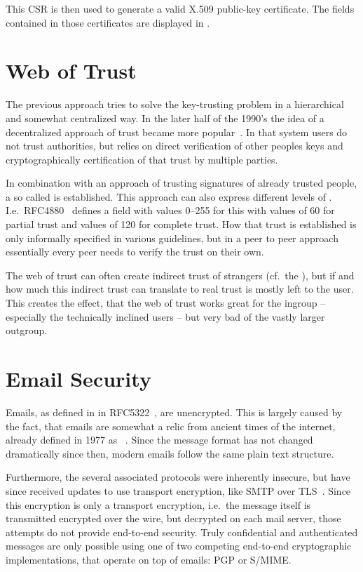 This CSR is then used to generate a valid X.509 public-key certificate.
The fields contained in those certificates are displayed in .

\section{Web of Trust}\label{sec:pgpWebOfTrust}
The previous approach tries to solve the key-trusting problem in a hierarchical and somewhat centralized way.
In the later half of the 1990's the idea of a decentralized approach of trust became more
popular~\cite{blaze1996decentralized, abdul1997pgp}.
In that system users do not trust authorities, but relies on direct verification of other peoples keys and
cryptographically certification of that trust by multiple parties.

In combination with an approach of trusting signatures of already trusted people, a so called  is
established.
This approach can also express different levels of .
I.e.\ RFC4880~\cite{RFC4880} defines a field with values 0--255 for this with values of 60 for partial trust and values
of 120 for complete trust.
How that trust is established is only informally specified in various guidelines, but in a peer to peer approach
essentially every peer needs to verify the trust on their own.

The web of trust can often create indirect trust of strangers (cf.\ the ),
but if and how much this indirect trust can translate to real trust is mostly left to the user.
This creates the effect, that the web of trust works great for the ingroup -- especially the technically inclined users
-- but very bad of the vastly larger outgroup.

\section{Email Security}\label{sec:emailSecurity}
Emails, as defined in in RFC5322~\cite{RFC5322}, are unencrypted.
This is largely caused by the fact, that emails are somewhat a relic from ancient times of the internet, already
defined in 1977 as ~\cite{RFC0733}.
Since the message format has not changed dramatically since then, modern emails follow the same plain text structure.

Furthermore, the several associated protocols were inherently insecure, but have since received updates to use transport
encryption, like SMTP over TLS~\cite{RFC3207}.
Since this encryption is only a transport encryption, i.e.\ the message itself is transmitted encrypted over the wire,
but decrypted on each mail server, those attempts do not provide end-to-end security.
Truly confidential and authenticated messages are only possible using one of two competing end-to-end cryptographic
implementations, that operate on top of emails: PGP or S/MIME\@.

